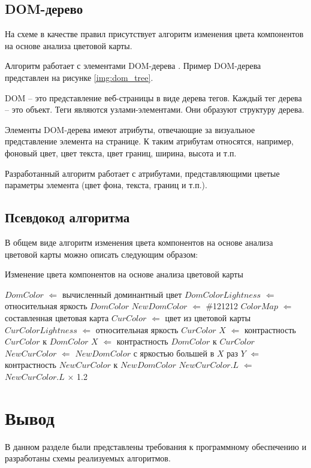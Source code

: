 \subsection{DOM-дерево}

На схеме в качестве правил присутствует алгоритм изменения цвета компонентов на основе анализа цветовой карты.

Алгоритм работает с элементами DOM-дерева \cite{dom}. Пример DOM-дерева представлен на рисунке \ref{img:dom_tree}.


DOM -- это представление веб-страницы в виде дерева тегов. Каждый тег дерева -- это объект. Теги являются узлами-элементами. Они образуют структуру дерева.

Элементы DOM-дерева имеют атрибуты, отвечающие за визуальное представление элемента на странице. К таким атрибутам относятся, например, фоновый цвет, цвет текста, цвет границ, ширина, высота и т.п.

Разработанный алгоритм работает с атрибутами, представляющими цветые параметры элемента (цвет фона, текста, границ и т.п.).

\subsection{Псевдокод алгоритма}

В общем виде алгоритм изменения цвета компонентов на основе анализа цветовой карты можно описать следующим образом:

\begin{algorithm}[H]
	\caption{Изменение цвета компонентов на основе анализа цветовой карты}
	\label{alg:analchange}
	\begin{algorithmic}[1]
		\State $DomColor$ $\Leftarrow$ вычисленный доминантный цвет
		\State $DomColorLightness$ $\Leftarrow$ относительная яркость $DomColor$
		\State $NewDomColor$ $\Leftarrow$ \#121212
		\State $ColorMap$ $\Leftarrow$ составленная цветовая карта
		\State $CurColor$ $\Leftarrow$ цвет из цветовой карты
		\State $CurColorLightness$ $\Leftarrow$ относительная яркость $CurColor$
		\State $X$ $\Leftarrow$ контрастность $CurColor$ к $DomColor$
		\Else
		\State $X$ $\Leftarrow$ контрастность $DomColor$ к $CurColor$
		\EndIf
		\State $NewCurColor$ $\Leftarrow$ $NewDomColor$ с яркостью большей в $X$ раз
		\State $Y$ $\Leftarrow$ контрастность $NewCurColor$ к $NewDomColor$
		\State $NewCurColor.L$ $\Leftarrow$ $NewCurColor.L$ $\times$ 1.2
		\EndWhile
		\EndFor
	\end{algorithmic}
\end{algorithm}

\section*{Вывод}

В данном разделе были представлены требования к программному обеспечению и разработаны схемы реализуемых алгоритмов.